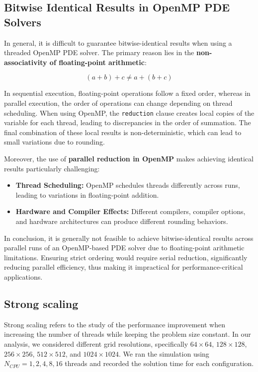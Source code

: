 \documentclass[unicode,11pt,a4paper,oneside,numbers=endperiod,openany]{scrartcl}
\begin{document}
\subsection{Bitwise Identical Results in OpenMP PDE Solvers}

In general, it is difficult to guarantee bitwise-identical results when using a threaded OpenMP PDE solver. The primary reason lies in the \textbf{non-associativity of floating-point arithmetic}:

\begin{equation}
    (a + b) + c \neq a + (b + c)
\end{equation}

In sequential execution, floating-point operations follow a fixed order, whereas in parallel execution, the order of operations can change depending on thread scheduling. When using OpenMP, the \texttt{reduction} clause creates local copies of the variable for each thread, leading to discrepancies in the order of summation. The final combination of these local results is non-deterministic, which can lead to small variations due to rounding.

Moreover, the use of \textbf{parallel reduction in OpenMP} makes achieving identical results particularly challenging:
\begin{itemize}
    \item \textbf{Thread Scheduling:} OpenMP schedules threads differently across runs, leading to variations in floating-point addition.
    \item \textbf{Hardware and Compiler Effects:} Different compilers, compiler options, and hardware architectures can produce different rounding behaviors.
\end{itemize}

In conclusion, it is generally not feasible to achieve bitwise-identical results across parallel runs of an OpenMP-based PDE solver due to floating-point arithmetic limitations. Ensuring strict ordering would require serial reduction, significantly reducing parallel efficiency, thus making it impractical for performance-critical applications.

\subsection{Strong scaling}
Strong scaling refers to the study of the performance improvement when increasing the number of threads while keeping the problem size constant. In our analysis, we considered different grid resolutions, specifically $64 \times 64$, $128 \times 128$, $256 \times 256$, $512 \times 512$, and $1024 \times 1024$. We ran the simulation using $N_{CPU} = 1, 2, 4, 8, 16$ threads and recorded the solution time for each configuration.
\end{document}
